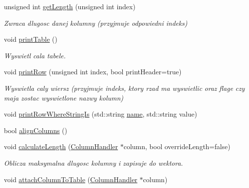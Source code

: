 \begin{DoxyCompactItemize}
unsigned int \mbox{\hyperlink{class_table_a9142623a172710464598aaa309ebd54d}{get\+Length}} (unsigned int index)
\begin{DoxyCompactList}\small\item\em Zwraca dlugosc danej kolumny (przyjmuje odpowiedni indeks) \end{DoxyCompactList}\item 
\mbox{\label{class_table_ac34865b32c2d5c1d8132494b21b04e15}} 
void \mbox{\hyperlink{class_table_ac34865b32c2d5c1d8132494b21b04e15}{print\+Table}} ()
\begin{DoxyCompactList}\small\item\em Wyswietl cala tabele. \end{DoxyCompactList}\item 
\mbox{\label{class_table_a8c1485bde4c0ca46649d24fe737aeb70}} 
void \mbox{\hyperlink{class_table_a8c1485bde4c0ca46649d24fe737aeb70}{print\+Row}} (unsigned int index, bool print\+Header=true)
\begin{DoxyCompactList}\small\item\em Wyswietla caly wiersz (przyjmuje indeks, ktory rzad ma wyswietlic oraz flage czy maja zostac wyswietlone nazwy kolumn) \end{DoxyCompactList}\item 
void \mbox{\hyperlink{class_table_a77b0e0d729f4dcee457a7e00b2bbd47f}{print\+Row\+Where\+String\+Is}} (std\+::string \mbox{\hyperlink{class_table_a776e2cab59507b3b59d475a964e347b8}{name}}, std\+::string value)
\item 
bool \mbox{\hyperlink{class_table_a33f193d8b41d0f262bbd6fbcea777301}{align\+Columns}} ()
\item 
\mbox{\label{class_table_a13020a54a789ce200774e6ccf09611ef}} 
void \mbox{\hyperlink{class_table_a13020a54a789ce200774e6ccf09611ef}{calculate\+Length}} (\mbox{\hyperlink{class_column_handler}{Column\+Handler}} $\ast$column, bool override\+Length=false)
\begin{DoxyCompactList}\small\item\em Oblicza maksymalna dlugosc kolumny i zapisuje do wektora. \end{DoxyCompactList}\item 
\mbox{\label{class_table_a7c61e72c0170dd36f81b15ebe0a1685f}} 
void \mbox{\hyperlink{class_table_a7c61e72c0170dd36f81b15ebe0a1685f}{attach\+Column\+To\+Table}} (\mbox{\hyperlink{class_column_handler}{Column\+Handler}} $\ast$column)

\end{DoxyCompactItemize}
